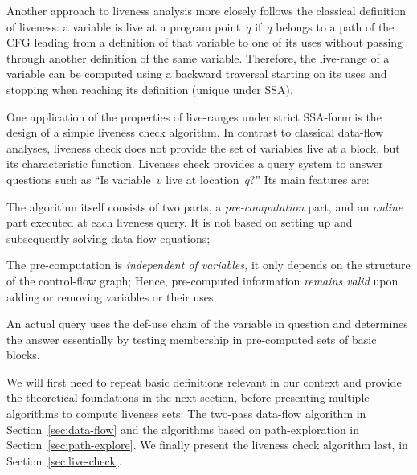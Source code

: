 Another approach to liveness analysis more closely follows the classical definition of liveness:
a variable is live at a program point~$q$ if~$q$ belongs to a path of the CFG leading from a definition of that variable to one of its uses without passing through another definition of the same variable.
Therefore, the live-range of a variable can be computed using a backward traversal starting on its uses and stopping when reaching its definition (unique under SSA).

One application of the properties of live-ranges under strict SSA-form is the design of a simple liveness check algorithm.
In contrast to classical data-flow analyses, liveness check does not provide the set of variables live at a block, but its characteristic function.
Liveness check provides a query system to answer questions such as ``Is variable~$v$ live at location~$q$?''
Its main features are:
\begin{compactenum}
\item
	The algorithm itself consists of two parts, a \emph{pre-computation} part, and an \emph{online} part executed at each liveness query.
	It is not based on setting up and subsequently solving data-flow equations;
\item
	The pre-computation is \emph{independent of variables,} it only depends on the structure of the control-flow graph;
	Hence, pre-computed information \emph{remains valid} upon adding or removing variables or their uses;
\item
	An actual query uses the def-use chain of the variable in question and determines the answer essentially by testing membership in pre-computed sets of basic blocks.
\end{compactenum}

We will first need to repeat basic definitions relevant in our context and provide the theoretical foundations in the next section, before presenting multiple algorithms to compute liveness sets: The two-pass data-flow algorithm in Section~\ref{sec:data-flow} and the algorithms based on path-exploration in Section~\ref{sec:path-explore}.
We finally present the liveness check algorithm last, in Section~\ref{sec:live-check}.

